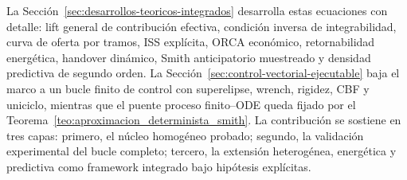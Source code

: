 La Sección~\ref{sec:desarrollos-teoricos-integrados} desarrolla estas ecuaciones con
detalle: lift general de contribución efectiva, condición inversa de integrabilidad,
curva de oferta por tramos, ISS explícita, ORCA económico, retornabilidad energética,
handover dinámico, Smith anticipatorio muestreado y densidad predictiva de segundo
orden. La Sección~\ref{sec:control-vectorial-ejecutable} baja el marco a un bucle
finito de control con superelipse, wrench, rigidez, CBF y uniciclo, mientras que el
puente proceso finito--ODE queda fijado por
el Teorema~\ref{teo:aproximacion_determinista_smith}. La contribución se sostiene en tres capas:
primero, el núcleo homogéneo probado; segundo, la validación experimental del bucle
completo; tercero, la extensión heterogénea, energética y predictiva como framework
integrado bajo hipótesis explícitas.

